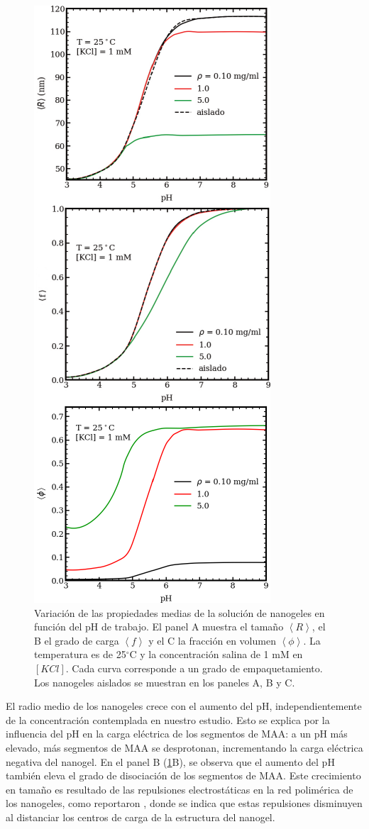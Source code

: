 	\begin{figure}[!htb]
		\centering
		\includegraphics[width=0.4\linewidth]{Figures/graph-mc/xvspH.pdf}
		\caption{Variaci\'on de las propiedades medias de la soluci\'on de nanogeles en funci\'on del pH de trabajo. El panel A muestra el tama\~no $\left<R\right>$, el B el grado de carga $\left<f\right>$ y el C la fracci\'on en volumen $\left<\phi\right>$. La temperatura es de 25$^\circ$C y la concentraci\'on salina de 1 mM en $[KCl]$. Cada curva corresponde a un grado de empaquetamiento. Los nanogeles aislados se muestran en los paneles A, B y C.}
		\label{fig:mc:xvspH}
	\end{figure}
	
	El radio medio de los nanogeles crece con el aumento del pH, independientemente de la concentraci\'on contemplada en nuestro estudio. Esto se explica por la  influencia del pH en la carga el\'ectrica de los segmentos de MAA: a un pH m\'as elevado, m\'as segmentos de MAA se desprotonan, incrementando la carga el\'ectrica negativa del nanogel. En el panel B (\ref{fig:mc:xvspH}B), se observa que el aumento del pH tambi\'en eleva el grado de disociaci\'on de los segmentos de MAA. Este crecimiento en tama\~no es resultado de las repulsiones electrost\'aticas en la red polim\'erica de los nanogeles, como reportaron \citet{perez2021thermodynamic}, donde se indica que estas repulsiones disminuyen al distanciar los centros de carga de la estructura del nanogel.
	
